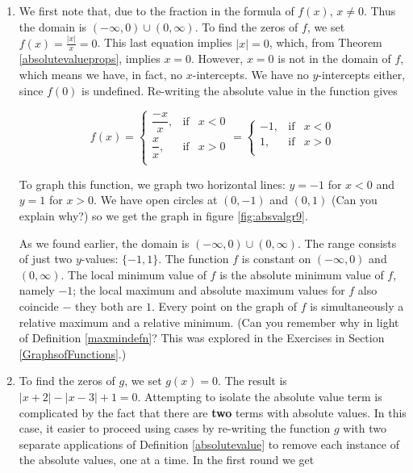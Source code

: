 {
\begin{enumerate}

\item  We first note that, due to the fraction in the formula of $f(x)$, $x \neq 0$.  Thus the domain is $(-\infty, 0) \cup (0, \infty)$.  To find the zeros of $f$, we set $f(x) = \frac{|x|}{x} = 0$.  This last equation implies $|x|=0$, which, from Theorem \ref{absolutevalueprops}, implies $x=0$.  However, $x=0$ is not in the domain of $f$, which means we have, in fact, no $x$-intercepts.  We have no $y$-intercepts either, since $f(0)$ is undefined.  Re-writing the absolute value in the function gives

\[ f(x) =\left\{ \begin{array}{rcl} \dfrac{-x}{x}, & \mbox{if} & x <0  \\ [10pt] \dfrac{x}{x}, & \mbox{if} & x > 0 \\ \end{array} \right. = \left\{ \begin{array}{rcl} -1, & \mbox{if} & x < 0 \\ 1, & \mbox{if} & x >0 \\ \end{array} \right. \]

To graph this function, we graph two horizontal lines:  $y = -1$ for $x < 0$ and $y = 1$ for $x > 0$.  We have open circles at $(0,-1)$ and $(0,1)$ (Can you explain why?) so we get the graph in figure \ref{fig:absvalgr9}.

\drawexampleline


As we found earlier, the domain is $(-\infty, 0)\cup(0,\infty)$.  The range consists of just two $y$-values: $\{-1,1\}$.  The function $f$ is constant on $(-\infty,0)$ and $(0,\infty)$.  The local minimum value of $f$ is the absolute minimum value of $f$, namely $-1$;  the local maximum and absolute maximum values for $f$ also coincide $-$ they both are $1$.  Every point on the graph of $f$ is simultaneously a relative maximum and a relative minimum. (Can you remember why in light of Definition \ref{maxmindefn}?  This was explored in the Exercises in Section \ref{GraphsofFunctions}.)

\item  To find the zeros of $g$, we set $g(x) = 0$.  The result is $|x+2|-|x-3| +1 = 0$.  Attempting to isolate the absolute value term is complicated by the fact that there are \textbf{two} terms with absolute values.  In this case, it easier to proceed using cases by re-writing the function $g$ with two separate applications of Definition \ref{absolutevalue} to remove each instance of the absolute values, one at a time.  In the first round we get 


\end{enumerate}}
